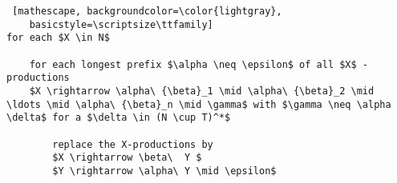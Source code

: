 \documentclass[
    border=0.2cm,
    convert={density=600}
]{standalone}
\begin{document}
\begin{lstlisting} [mathescape, backgroundcolor=\color{lightgray},
	basicstyle=\scriptsize\ttfamily]
for each $X \in N$ 
	    
    for each longest prefix $\alpha \neq \epsilon$ of all $X$ - productions 
    $X \rightarrow \alpha\ {\beta}_1 \mid \alpha\ {\beta}_2 \mid \ldots \mid \alpha\ {\beta}_n \mid \gamma$ with $\gamma \neq \alpha \delta$ for a $\delta \in (N \cup T)^*$
	    
        replace the X-productions by
        $X \rightarrow \beta\  Y $
        $Y \rightarrow \alpha\ Y \mid \epsilon$
	     
	            
\end{lstlisting}
\end{document}
